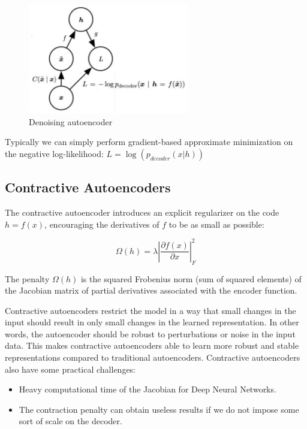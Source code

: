 \begin{figure}[h]
    \centering
    \includegraphics[width=7cm]{Images/denoising-autoencoder.jpg}
    \caption{Denoising autoencoder}
    \label{fig:denoising-autoencoder}
\end{figure}

\noindent Typically we can simply perform gradient-based approximate minimization on the negative log-likelihood: $L = \log(p_{decoder}(x \vert h))$


\subsection{Contractive Autoencoders}

The contractive autoencoder introduces an explicit regularizer on the code $h = f(x)$, encouraging the derivatives of $f$ to be as small as possible:

$$\Omega (h) = \lambda \left| \frac{\partial f (x)}{\partial x} \right|_{F}^{2} $$


The penalty $\Omega (h)$ is the squared Frobenius norm (sum of squared elements) of the Jacobian matrix of partial derivatives associated with the encoder function.

\noindent Contractive autoencoders restrict the model in a way that small changes in the input should result in only small changes in the learned representation. In other words, the autoencoder should be robust to perturbations or noise in the input data. This makes contractive autoencoders able to learn more robust and stable representations compared to traditional autoencoders. Contractive autoencoders also have some practical challenges:

\begin{itemize}
    \item Heavy computational time of the Jacobian for Deep Neural Networks.
    \item The contraction penalty can obtain useless results if we do not impose some sort of scale on the decoder.
\end{itemize}
